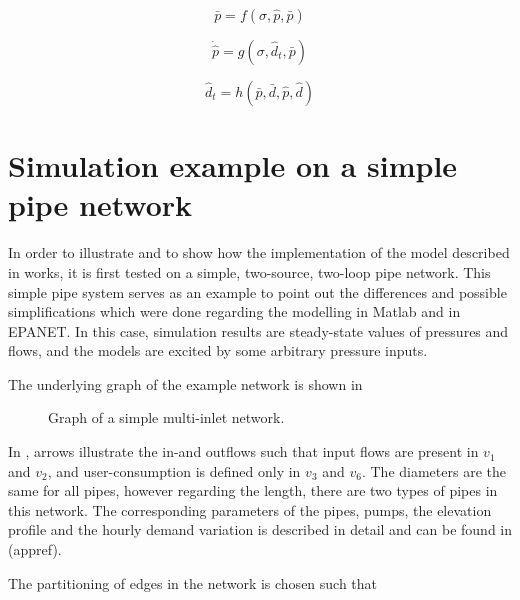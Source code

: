 \begin{equation}
\label{eq1}
\bar{p} = f(\sigma,\hat{p}, \bar{p})
\end{equation}

\begin{equation}
\label{eq2}
\dot{\hat{p}} = g(\sigma,\hat{d}_t, \bar{p})
\end{equation}

\begin{equation}
\label{eq3}
\hat{d}_t = h(\bar{p}, \bar{d}, \hat{p}, \hat{d})
\end{equation}

\newpage

\section{Simulation example on a simple pipe network}
\label{multi_inlet_network_example}

In order to illustrate and to show how the implementation of the model described in  works, it is first tested on a simple, two-source, two-loop pipe network. This simple pipe system serves as an example to point out the differences and possible simplifications which were done regarding the modelling in Matlab and in EPANET. In this case, simulation results are steady-state values of pressures and flows, and the models are excited by some arbitrary pressure inputs. 

The underlying graph of the example network is shown in 

\begin{figure}[H]
\centering
 
\caption{Graph of a simple multi-inlet network.}
\label{fig:example1_graph}
\end{figure}

In , arrows illustrate the in-and outflows such that input flows are present in $v_1 $ and $v_2$, and user-consumption is defined only in $v_3$ and $v_6$. The diameters are the same for all pipes, however regarding the length, there are two types of pipes in this network. The corresponding parameters of the pipes, pumps, the elevation profile and the hourly demand variation is described in detail and can be found in (appref). 

The partitioning of edges in the network is chosen such that

